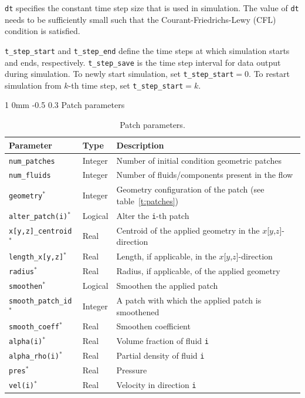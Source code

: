 \documentclass[11pt]{article}
\makeatletter
\renewcommand{\subsubsection}{\@startsection
{subsubsection}%
{1}%
{0mm}%
{-0.5\baselineskip}%
{0.3\baselineskip}%
{\normalfont\normalsize\bfseries\color{myBrown}}}%
\newcommand\tablefont{\footnotesize}
\makeatother
\begin{document}
\texttt{dt} specifies the constant time step size that is used in simulation. The value of \texttt{dt} needs to be sufficiently small such that the Courant-Friedrichs-Lewy (CFL) condition is satisfied.

\texttt{t\_step\_start} and \texttt{t\_step\_end} define the time steps at which simulation starts and ends, respectively. \texttt{t\_step\_save} is the time step interval for data output during simulation. To newly start simulation, set \texttt{t\_step\_start}$=0$. To restart simulation from $k$-th time step, set \texttt{t\_step\_start}$=k$.

\subsubsection{Patch parameters}
\begin{table}[H]
{\tablefont
\begin{tabularx}{6.5in}{ | R{1.5in} C{1in} Q{3.5in} | }
\hline
\textbf{Parameter} & \textbf{Type} & \textbf{Description} \\ \hline
    \texttt{num\_patches}	&	Integer &		Number of initial condition geometric patches \\
    \texttt{num\_fluids}	&		Integer &		Number of fluids/components present in the flow \\
    \texttt{geometry}$^*$ &			Integer &	Geometry configuration of the patch (see table~\ref{t:patches})	\\
    \texttt{alter\_patch(i)}$^*$ &		Logical &	Alter the \texttt{i}-th patch \\
    \texttt{x[y,z]\_centroid}$^*$ &	Real	 &	Centroid of the applied geometry in the $x$[$y$,$z$]-direction	\\
    \texttt{length\_x[y,z]}$^*$ &		Real	 & 	Length, if applicable, in the $x$[$y$,$z$]-direction	\\
    \texttt{radius}$^*$ &			Real	 &	Radius, if applicable, of the applied geometry	\\
    \texttt{smoothen}$^*$ &		Logical &	Smoothen the applied patch	\\
    \texttt{smooth\_patch\_id}$^*$ &	Integer &	A patch with which the applied patch is smoothened	\\
    \texttt{smooth\_coeff}$^*$ &		Real	 &	Smoothen coefficient	 \\
    \texttt{alpha(i)}$^*$ &			Real &	Volume fraction of fluid \texttt{i}	\\
    \texttt{alpha\_rho(i)}$^*$ &		Real &	Partial density of fluid \texttt{i}	\\
    \texttt{pres}$^*$ &			Real &	Pressure	\\
    \texttt{vel(i)}$^*$ &			Real &	Velocity in direction \texttt{i}
    \\ \hline
\end{tabularx}}
\caption{Patch parameters.}
\label{t:pp}
\end{table}
\end{document}
